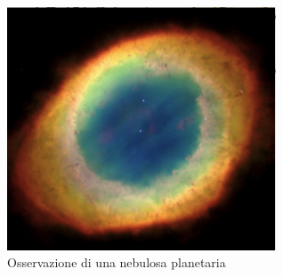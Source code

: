 \documentclass[a4paper,11pt]{article}
\begin{document}
    \begin{figure}[h!!]
        \centering
        \includegraphics[width=8cm]{Osservazione di nebulosa stellare.png}
        \caption{Osservazione di una nebulosa planetaria}
        \label{fig:Osservazione di nebulosa stellare.png}
    \end{figure}
    
\end{document}
